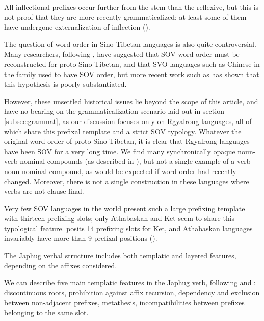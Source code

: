\documentclass[oldfontcommands,twoside,a4paper,12pt]{article}
\begin{document}
 All inflectional prefixes occur further from the stem than the reflexive, but this is not proof that they are more recently grammaticalized: at least some of them have undergone externalization of inflection (\citealt{haspelmath93extern}). 

The question of word order in Sino-Tibetan languages is also quite controversial. Many researchers, following \citet{li74svo}, have suggested that SOV word order must be reconstructed for proto-Sino-Tibetan, and that SVO languages such as Chinese in the family used to have SOV order, but more recent work such as \citet{dpw07} has shown that this hypothesis is poorly substantiated. 

However, these unsettled historical issues lie beyond the scope of this article, and have no bearing  on the grammaticalization scenario laid out in section \ref{subsec:grammat}, as our discussion focuses only on Rgyalrong languages,  all of which share this prefixal template and a strict SOV typology. Whatever the original word order of proto-Sino-Tibetan, it is clear that Rgyalrong languages have been SOV for a very long time. We find many synchronically opaque noun-verb nominal compounds (as described in \citealt{jacques12incorp}), but not a single example of a verb-noun nominal compound, as would be expected if word order had recently changed. Moreover, there is not a single construction in these languages where verbs are not clause-final.

Very few SOV languages in the world present such a large prefixing template with thirteen prefixing slots; only Athabaskan and Ket seem to share this typological feature. \citet[154-5]{werner97ketisch} posits 14 prefixing slots for Ket, and Athabaskan languages invariably have more than 9 prefixal positions (\citealt[402-405]{rice2000scope}). 



The Japhug verbal structure includes both templatic and layered features, depending on the affixes considered.


We can describe five main templatic features in the Japhug verb, following \citet[10-14]{rice2000scope} and \citet[218]{bickel07inflectional}: discontinuous roots, prohibition against affix recursion, dependency and exclusion between non-adjacent prefixes, metathesis, incompatibilities between prefixes belonging to the same slot.
\end{document}
